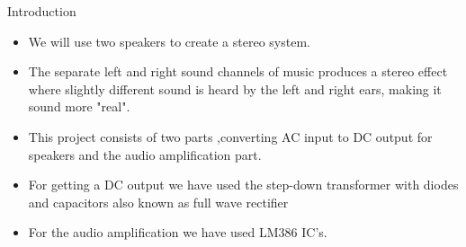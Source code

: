 \documentclass{beamer}
\begin{document}
\begin{frame}{Introduction}
  \begin{itemize}
  \item 
 We will use two speakers to create a stereo system.
  
  \item   
    The separate left and right sound channels of music  produces a stereo effect where slightly different sound is heard by the left and right ears, making it sound more "real".
  
  \item
    This project consists of two parts ,converting AC input to DC output for speakers and the audio amplification part. 
 
  \item
    For getting a DC output we have used the step-down transformer with diodes and capacitors also known as full wave rectifier
  \item
   For the audio amplification we have used LM386 IC's.
  \end{itemize}
\end{frame}
\end{document}

